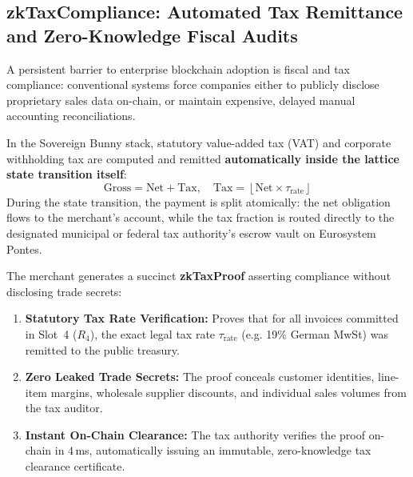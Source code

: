 \documentclass[a4paper,11pt,twoside,parskip=half-,headings=small]{scrartcl}
\begin{document}
\subsection{zkTaxCompliance: Automated Tax Remittance and Zero-Knowledge Fiscal Audits}
\label{sec:zk_tax_compliance}

A persistent barrier to enterprise blockchain adoption is fiscal and tax compliance: conventional systems force companies
either to publicly disclose proprietary sales data on-chain, or maintain expensive, delayed manual accounting reconciliations.

In the Sovereign Bunny stack, statutory value-added tax (VAT) and corporate withholding tax are computed and remitted
\textbf{automatically inside the lattice state transition itself}:
\begin{equation}
  \text{Gross} = \text{Net} + \text{Tax}, \quad \text{Tax} = \left\lfloor \text{Net} \times \tau_{\text{rate}} \right\rfloor
\end{equation}
During the state transition, the payment is split atomically: the net obligation flows to the merchant's account,
while the tax fraction is routed directly to the designated municipal or federal tax authority's escrow vault on Eurosystem Pontes.

The merchant generates a succinct \textbf{zkTaxProof} asserting compliance without disclosing trade secrets:
\begin{enumerate}
  \item \textbf{Statutory Tax Rate Verification:} Proves that for all invoices committed in Slot~4 ($R_4$), the exact legal tax rate $\tau_{\text{rate}}$ (e.g. 19\% German MwSt) was remitted to the public treasury.
  \item \textbf{Zero Leaked Trade Secrets:} The proof conceals customer identities, line-item margins, wholesale supplier discounts, and individual sales volumes from the tax auditor.
  \item \textbf{Instant On-Chain Clearance:} The tax authority verifies the proof on-chain in $4$\,ms, automatically issuing an immutable, zero-knowledge tax clearance certificate.
\end{enumerate}
\end{document}
